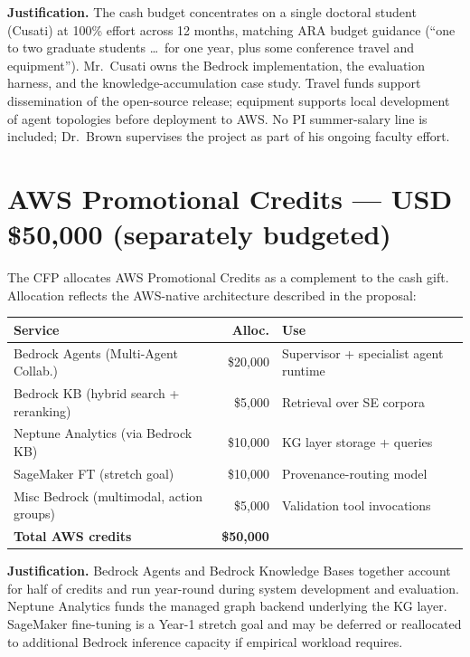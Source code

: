 \documentclass[11pt]{article}
\begin{document}
\textbf{Justification.} The cash budget concentrates on a single doctoral student (Cusati) at 100\% effort across 12 months, matching ARA budget guidance (``one to two graduate students \dots\ for one year, plus some conference travel and equipment''). Mr.~Cusati owns the Bedrock implementation, the evaluation harness, and the knowledge-accumulation case study. Travel funds support dissemination of the open-source release; equipment supports local development of agent topologies before deployment to AWS. No PI summer-salary line is included; Dr.~Brown supervises the project as part of his ongoing faculty effort.

\section*{AWS Promotional Credits --- USD \$50,000 (separately budgeted)}

The CFP allocates AWS Promotional Credits as a complement to the cash gift. Allocation reflects the AWS-native architecture described in the proposal:

\vspace{-0.3em}

\begin{table}[h]
\centering
\small
\begin{tabular}{p{2.6in} r p{2.0in}}
\toprule
\textbf{Service} & \textbf{Alloc.} & \textbf{Use} \\
\midrule
Bedrock Agents (Multi-Agent Collab.) & \$20,000 & Supervisor + specialist agent runtime \\
Bedrock KB (hybrid search + reranking) & \$5,000 & Retrieval over SE corpora \\
Neptune Analytics (via Bedrock KB) & \$10,000 & KG layer storage + queries \\
SageMaker FT (stretch goal) & \$10,000 & Provenance-routing model \\
Misc Bedrock (multimodal, action groups) & \$5,000 & Validation tool invocations \\
\midrule
\textbf{Total AWS credits} & \textbf{\$50,000} & \\
\bottomrule
\end{tabular}
\end{table}

\vspace{-0.4em}

\textbf{Justification.} Bedrock Agents and Bedrock Knowledge Bases together account for half of credits and run year-round during system development and evaluation. Neptune Analytics funds the managed graph backend underlying the KG layer. SageMaker fine-tuning is a Year-1 stretch goal and may be deferred or reallocated to additional Bedrock inference capacity if empirical workload requires.
\end{document}
